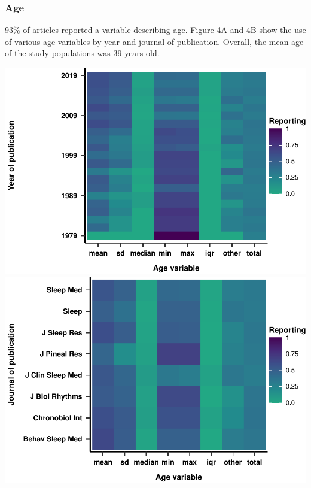 \documentclass[
  english,
  jou,floatsintext]{apa6}
\begin{document}
\hypertarget{age}{%
\subsubsection{Age}\label{age}}

93\% of articles reported a variable describing age. Figure 4A and 4B show the use of various age variables by year and journal of publication. Overall, the mean age of the study populations was 39 years old.

\includegraphics{article_files/figure-latex/unnamed-chunk-6-1.pdf}
\includegraphics{article_files/figure-latex/unnamed-chunk-7-1.pdf}
\end{document}
